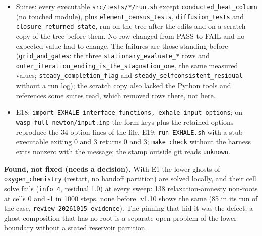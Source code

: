 \documentclass[english,a4paper]{my_memo}
\begin{document}
\begin{itemize}
\begin{itemize}
    The final build (\texttt{oxygen\_rates.f90} restored, \texttt{95a1372f...}) reproduces the outputs of \texttt{post\_backport\_v100.x} bitwise on \texttt{hp\_zero\_seed}, \texttt{hydrostatic\_column}, \texttt{oxygen\_chemistry} and \texttt{iontrans\_metals}.
  \item
    No change is in a physically wrong direction: the stationary changes are at the solver\textquotesingle s tolerance and the solves converge tighter; the \texttt{oxygen\_chemistry} change is the transient response to ghosts that are no longer pinned to stale values. The goldens were not refreshed (user decision pending); \texttt{oxygen\_chemistry} and the two JFNK cases will no longer match them bitwise, the last two within \texttt{REGRESSION\_REL\_TOL}.
  \end{itemize}
\item
  Suites: every executable \texttt{src/tests/*/run.sh} except \texttt{conducted\_heat\_column} (no touched module), plus \texttt{element\_census\_tests}, \texttt{diffusion\_tests} and \texttt{closure\_returned\_state}, run on the tree after the edits and on a scratch copy of the tree before them. No row changed from PASS to FAIL and no expected value had to change. The failures are those standing before (\texttt{grid\_and\_gates}: the three \texttt{stationary\_evaluate\_*} rows and \texttt{outer\_iteration\_ending\_is\_the\_stagnation\_one}, the same measured values; \texttt{steady\_completion\_flag} and \texttt{steady\_selfconsistent\_residual} without a run log); the scratch copy also lacked the Python tools and references some suites read, which removed rows there, not here.
\item
  E18: \texttt{import\ EXHALE\_interface\_functions,\ exhale\_input\_options}; on \texttt{wasp\_full\_newton/input.inp} the form keys plus the retained options reproduce the 34 option lines of the file. E19: \texttt{run\_EXHALE.sh} with a stub executable exiting 0 and 3 returns 0 and 3; \texttt{make\ check} without the harness exits nonzero with the message; the stamp outside git reads \texttt{unknown}.
\end{itemize}

\textbf{Found, not fixed (needs a decision).} With E1 the lower ghosts of \texttt{oxygen\_chemistry} (restart, no handoff partition) are solved locally, and their cell solve fails (\texttt{info\ 4}, residual 1.0) at every sweep: 138 relaxation-amnesty non-roots at cells 0 and -1 in 1000 steps, none before. v1.10 shows the same (85 in its run of the case, \texttt{review\_20261015\_evidence}). The pinning that hid it was the defect; a ghost composition that has no root is a separate open problem of the lower boundary without a stated reservoir partition.
\end{document}
